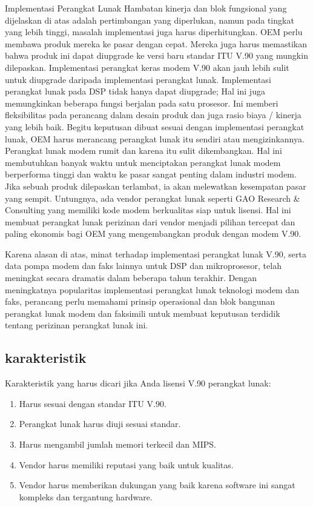Implementasi Perangkat Lunak
Hambatan kinerja dan blok fungsional yang dijelaskan di atas adalah pertimbangan yang diperlukan, namun pada tingkat yang lebih tinggi, masalah implementasi juga harus diperhitungkan. OEM perlu membawa produk mereka ke pasar dengan cepat. Mereka juga harus memastikan bahwa produk ini dapat diupgrade ke versi baru standar ITU V.90 yang mungkin dilepaskan. Implementasi perangkat keras modem V.90 akan jauh lebih sulit untuk diupgrade daripada implementasi perangkat lunak. Implementasi perangkat lunak pada DSP tidak hanya dapat diupgrade; Hal ini juga memungkinkan beberapa fungsi berjalan pada satu prosesor. Ini memberi fleksibilitas pada perancang dalam desain produk dan juga rasio biaya / kinerja yang lebih baik. Begitu keputusan dibuat sesuai dengan implementasi perangkat lunak, OEM harus merancang perangkat lunak itu sendiri atau mengizinkannya. Perangkat lunak modem rumit dan karena itu sulit dikembangkan. Hal ini membutuhkan banyak waktu untuk menciptakan perangkat lunak modem berperforma tinggi dan waktu ke pasar sangat penting dalam industri modem. Jika sebuah produk dilepaskan terlambat, ia akan melewatkan kesempatan pasar yang sempit. Untungnya, ada vendor perangkat lunak seperti GAO Research \& Consulting yang memiliki kode modem berkualitas siap untuk lisensi. Hal ini membuat perangkat lunak perizinan dari vendor menjadi pilihan tercepat dan paling ekonomis bagi OEM yang mengembangkan produk dengan modem V.90.

Karena alasan di atas, minat terhadap implementasi perangkat lunak V.90, serta data pompa modem dan faks lainnya untuk DSP dan mikroprosesor, telah meningkat secara dramatis dalam beberapa tahun terakhir. Dengan meningkatnya popularitas implementasi perangkat lunak teknologi modem dan faks, perancang perlu memahami prinsip operasional dan blok bangunan perangkat lunak modem dan faksimili untuk membuat keputusan terdidik tentang perizinan perangkat lunak ini.

\subsection {karakteristik}
Karakteristik yang harus dicari jika Anda lisensi V.90 perangkat lunak:
\begin{enumerate}
\item Harus sesuai dengan standar ITU V.90.
\item Perangkat lunak harus diuji sesuai standar.
\item Harus mengambil jumlah memori terkecil dan MIPS.
\item Vendor harus memiliki reputasi yang baik untuk kualitas.
\item Vendor harus memberikan dukungan yang baik karena software ini sangat kompleks dan tergantung hardware.
\end{enumerate}
